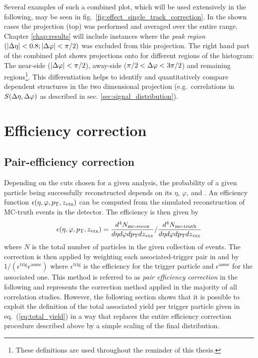 Several examples of such a combined plot, which will be used extensively in the following, may be seen in fig.~\ref{fig:effect_single_track_correction}. In the shown cases the \dphi projection (top) was performed and averaged over the entire \deta range. Chapter \ref{chap:results} will include instances where the \emph{peak region} $(|\Delta\eta|< 0.8; |\Delta\varphi| < \pi /2)$ was excluded from this projection. The right hand part of the combined plot shows projections onto \deta for different regions of the histogram: The \gls{near-side} ($|\Delta\varphi| < \pi /2$), \gls{away-side} ($\pi /2 < \Delta\varphi < 3\pi/2$) and remaining regions\footnote{These definitions are used throughout the reminder of this thesis.}.  This differentiation helps to identify and quantitatively compare \dphi dependent structures in the two dimensional projection (e.g.\ correlations in $S(\Delta\eta, \Delta\varphi )$ as described in sec. \ref{sec:signal_distribution}).


\section{Efficiency correction}
\label{sec:effic-corr}

\subsection{Pair-efficiency correction}
\label{sec:single-track-corr}
Depending on the cuts chosen for a given analysis, the probability of a given particle being successfully reconstructed depends on its $\eta$, $\varphi$, \pt and \zvtx. An efficiency function $\epsilon(\eta, \varphi, p_{\text{T}}, z_{\text{vtx}})$ can be computed from the simulated reconstruction of MC-truth events in the detector. The efficiency is then given by
\begin{equation}
  \label{eq:eff_theo}
  \epsilon (\eta, \varphi, p_{\text{T}}, z_{\text{vtx}}) =
  \frac{d^4N_{\text{mc-recon}}}{d\eta d\varphi dp_{\text{T}} dz_{\text{vtx}}} /
  \frac{d^4N_{\text{mc-truth}}}{d\eta d\varphi dp_{\text{T}} dz_{\text{vtx}}}
\end{equation}
where $N$ is the total number of particles in the given collection of events. The correction is then applied by weighting each associated-trigger pair in \Sig and \B by $1/(\epsilon^{\text{trig}}\epsilon^{\text{assoc}})$ where $\epsilon^{\text{trig}}$ is the efficiency for the trigger particle and $\epsilon^{\text{assoc}}$ for the associated one. This method is referred to as \emph{pair efficiency correction} in the following and represents the correction method applied in the majority of all correlation studies\cite{Schuster2013,Abelev2012}. However, the following section shows that it is possible to exploit the definition of the total associated yield per trigger particle given in eq.~(\ref{eq:total_yield}) in a way that replaces the entire efficiency correction procedure described above by a simple scaling of the final distribution. 


